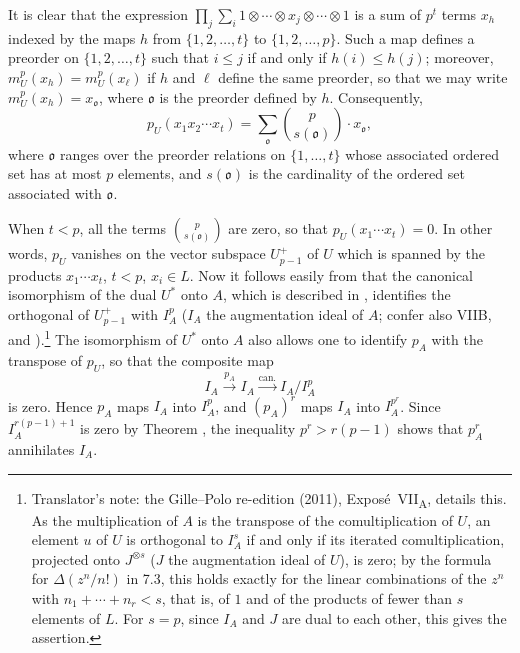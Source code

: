It is clear that the expression
\(\prod_j\sum_i1\otimes\cdots\otimes x_j\otimes\cdots\otimes1\) is a sum of
\(p^t\) terms \(x_h\) indexed by the maps \(h\) from
\(\{1,2,\ldots,t\}\) to \(\{1,2,\ldots,p\}\). Such a map defines a
preorder on \(\{1,2,\ldots,t\}\) such that \(i\leq j\) if and only if
\(h(i)\leq h(j)\); moreover, \(m_U^p(x_h)=m_U^p(x_\ell)\) if \(h\) and
\(\ell\) define the same preorder, so that we may write
\(m_U^p(x_h)=x_{\mathfrak o}\), where \(\mathfrak o\) is the preorder
defined by \(h\). Consequently,
\[
  p_U(x_1x_2\cdots x_t)
  =
  \sum_{\mathfrak o}\binom{p}{s(\mathfrak o)}\cdot x_{\mathfrak o},
\]
where \(\mathfrak o\) ranges over the preorder relations on
\(\{1,\ldots,t\}\) whose associated ordered set has at most \(p\)
elements, and \(s(\mathfrak o)\) is the cardinality of the ordered set
associated with \(\mathfrak o\).

When \(t<p\), all the terms \(\binom{p}{s(\mathfrak o)}\) are zero, so
that \(p_U(x_1\cdots x_t)=0\). In other words, \(p_U\) vanishes on the
vector subspace \(U_{p-1}^+\) of \(U\) which is spanned by the products
\(x_1\cdots x_t\), \(t<p\), \(x_i\in L\). Now it follows easily from
 that the canonical isomorphism of the dual \(U^*\) onto \(A\),
which is described in , identifies the orthogonal of
\(U_{p-1}^+\) with \(I_A^p\) (\(I_A\) the augmentation ideal of \(A\);
confer also VIIB,  and ).\footnote{Translator's note:
the Gille--Polo re-edition (2011), Expos\'e~VII\textsubscript{A}, details
this. As the multiplication of \(A\) is the transpose of the
comultiplication of \(U\), an element \(u\) of \(U\) is orthogonal to
\(I_A^s\) if and only if its iterated comultiplication, projected onto
\(J^{\otimes s}\) (\(J\) the augmentation ideal of \(U\)), is zero; by the
formula for \(\Delta(z^n/n!)\) in 7.3, this holds exactly for the linear
combinations of the \(z^n\) with \(n_1+\cdots+n_r<s\), that is, of \(1\)
and of the products of fewer than \(s\) elements of \(L\). For \(s=p\),
since \(I_A\) and \(J\) are dual to each other, this gives the
assertion.} The isomorphism of \(U^*\) onto
\(A\) also allows one to identify \(p_A\) with the transpose of \(p_U\),
so that the composite map
\[
  I_A\xrightarrow{p_A}I_A\xrightarrow{\text{can.}}I_A/I_A^p
\]
is zero. Hence \(p_A\) maps \(I_A\) into \(I_A^p\), and \((p_A)^r\) maps
\(I_A\) into \(I_A^{p^r}\). Since \(I_A^{r(p-1)+1}\) is zero by Theorem
, the inequality \(p^r>r(p-1)\) shows that \(p_A^r\) annihilates
\(I_A\).


